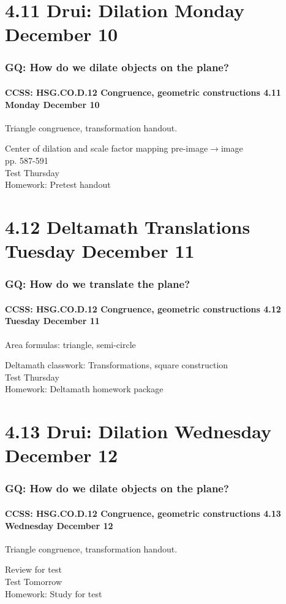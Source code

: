 \documentclass{beamer}
\begin{document}
  \section{4.11 Drui: Dilation Monday December 10}
    \frame
    {
      \frametitle{GQ: How do we dilate objects on the plane?}
      \framesubtitle{CCSS: HSG.CO.D.12 Congruence, geometric constructions  \alert{4.11 Monday December 10}}

      \begin{block}{Triangle congruence, transformation handout.}
      \end{block} \vspace{0.5cm}
      Center of dilation and scale factor mapping pre-image$\rightarrow$image\\
      pp. 587-591\\[0.5cm]
      \alert{Test Thursday} \\[0.5cm]
      Homework: Pretest handout
    }

  \section{4.12 Deltamath Translations Tuesday December 11}
    \frame
    {
      \frametitle{GQ: How do we translate the plane?}
      \framesubtitle{CCSS: HSG.CO.D.12 Congruence, geometric constructions  \alert{4.12 Tuesday December 11}}

      \begin{block}{Area formulas: triangle, semi-circle}
      \end{block}
      Deltamath classwork: Transformations, square construction\\[0.5cm]
      \alert{Test Thursday} \\[0.5cm]
      Homework: Deltamath homework package
    }

  \section{4.13 Drui: Dilation Wednesday December 12}
    \frame
    {
      \frametitle{GQ: How do we dilate objects on the plane?}
      \framesubtitle{CCSS: HSG.CO.D.12 Congruence, geometric constructions  \alert{4.13 Wednesday December 12}}

      \begin{block}{Triangle congruence, transformation handout.}
      \end{block} \vspace{0.5cm}
      Review for test\\[0.5cm]
      \alert{Test Tomorrow} \\[0.5cm]
      Homework: Study for test
    }
\end{document}
